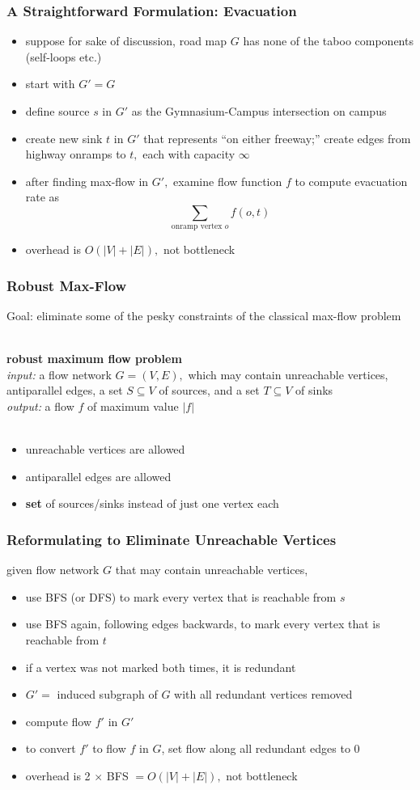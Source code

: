\documentclass{beamer}
\newcommand{\stanza}{ \\~\ }
\begin{document}
\begin{frame} \frametitle{A Straightforward Formulation: Evacuation}
\begin{itemize}
  \item suppose for sake of discussion, road map $G$ has none of the taboo components (self-loops etc.)
  \item start with $G'=G$
  \item define source $s$ in $G'$ as the Gymnasium-Campus intersection on campus
  \item create new sink $t$ in $G'$ that represents ``on either freeway;''
    create edges from highway onramps to $t,$ each with capacity $\infty$
  \item after finding max-flow in $G',$ examine flow function $f$ to compute
    evacuation rate as
    \[ \sum_{\text{onramp vertex }o} f(o, t) \]
  \item overhead is $O(|V|+|E|),$ not bottleneck
\end{itemize}
\end{frame}

\begin{frame} \frametitle{Robust Max-Flow}
Goal: eliminate some of the pesky constraints of the classical max-flow problem
\stanza

\textbf{robust maximum flow problem} \\
\emph{input:} a flow network $G=(V,E),$ which may contain unreachable vertices,
antiparallel edges, a set $S \subseteq V$ of sources, and a set $T \subseteq V$
  of sinks\\
\emph{output:} a flow $f$ of maximum value $|f|$ \stanza
\vspace{.5cm}
\begin{itemize}
  \item unreachable vertices are allowed
  \item antiparallel edges are allowed
  \item \textbf{set} of sources/sinks instead of just one vertex each
\end{itemize}
\end{frame}

\begin{frame} \frametitle{Reformulating to Eliminate Unreachable Vertices}
given flow network $G$ that may contain unreachable vertices,
\begin{itemize}
  \item use BFS (or DFS) to mark every vertex that is reachable from $s$
  \item use BFS again, following edges backwards, to mark every vertex that is reachable from $t$
  \item if a vertex was not marked both times, it is redundant
  \item $G' = $ induced subgraph of $G$ with all redundant vertices removed
  \item compute flow $f'$ in $G'$
  \item to convert $f'$ to flow $f$ in $G$, set flow along all redundant edges to 0
  \item overhead is 2 $\times$ BFS $= O(|V|+|E|),$ not bottleneck
\end{itemize}
\end{frame}
\end{document}
